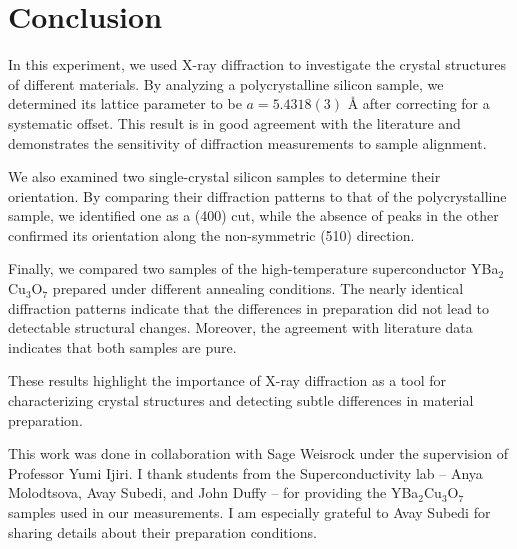 \documentclass{../paper}
\begin{document}
\section{Conclusion}\label{sec:conclusion}

In this experiment, we used X-ray diffraction to investigate the crystal structures of different materials. By analyzing a polycrystalline silicon sample, we determined its lattice parameter to be $a = 5.4318(3)$ \AA{} after correcting for a systematic offset. This result is in good agreement with the literature and demonstrates the sensitivity of diffraction measurements to sample alignment.

We also examined two single-crystal silicon samples to determine their orientation. By comparing their diffraction patterns to that of the polycrystalline sample, we identified one as a (400) cut, while the absence of peaks in the other confirmed its orientation along the non-symmetric (510) direction.

Finally, we compared two samples of the high-temperature superconductor YBa$_2$Cu$_3$O$_7$ prepared under different annealing conditions. The nearly identical diffraction patterns indicate that the differences in preparation did not lead to detectable structural changes. Moreover, the agreement with literature data indicates that both samples are pure.

These results highlight the importance of X-ray diffraction as a tool for characterizing crystal structures and detecting subtle differences in material preparation.

\begin{acknowledgements}
  This work was done in collaboration with Sage Weisrock under the supervision of Professor Yumi Ijiri. I thank students from the Superconductivity lab -- Anya Molodtsova, Avay Subedi, and John Duffy -- for providing the YBa$_2$Cu$_3$O$_7$ samples used in our measurements. I am especially grateful to Avay Subedi for sharing details about their preparation conditions.
\end{acknowledgements}


\end{document}
